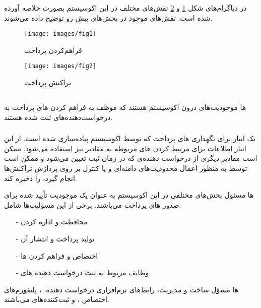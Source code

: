 \documentclass[oneside]{report}
\begin{document}
در دیاگرام‌های شکل 
\ref{fig:fig1}
و 
\ref{fig:fig2}
 نقش‌های مختلف در این اکوسیستم  بصورت خلاصه آورده شده است. نقش‌های موجود در بخش‌های پیش رو توضیح داده می‌شوند.

\begin{figure}
	\centering
	\texttt{[image: images/fig1]}
	\caption{فراهم‌کردن{\footnotesize  {}} پرداخت }
	\label{fig:fig1}
\end{figure}

\begin{figure}
	\centering
	\texttt{[image: images/fig2]}
	\caption{تراکنش {\footnotesize  {}} پرداخت}
	\label{fig:fig2}
\end{figure}
\newpage
\subsection{{\normalsize {}}}
		{\normalsize  {}}ها 
		موجودیت‌های درون اکوسیستم
		{\normalsize  {}}
		هستند که موظف به فراهم کردن 
		{\normalsize  {}}های
		پرداخت به درخواست‌دهنده‌های 
		{\normalsize  {}}
		ثبت شده هستند. 
 
 \subsubsection{{\small {}}}
			یک انبار برای نگهداری 
			{\normalsize {}}های
			پرداخت که توسط اکوسیستم 
			{\normalsize {}}
			پیاده‌سازی شده است. از این انبار اطلاعات برای مرتبط کردن 
			{\normalsize {}}‌های 
			مربوطه به مقادیر 
			{\normalsize {}}
			نیز استفاده می‌شود. 
			{\normalsize {}}
			ممکن است مقادیر دیگری از درخواست دهنده‌ی 
			{\normalsize {}}
			که در زمان ثبت تعیین می‌شود و ممکن است توسط 
			{\normalsize {}}
			به منظور اعمال محدودیت‌های دامنه‌ای و یا کنترل بر روی پردازش تراکنش‌ها انجام گیرد، را ذخیره کند.
					
	{\normalsize {}}ها 
	مسئول بخش‌‌های مختلفی در این اکوسیستم به عنوان  یک موجودیت تأیید شده برای صدور 
	{\normalsize {}}های 
	پرداخت می‌باشند. برخی از این مسؤلیت‌ها شامل‌:
	\begin{itemize}
		\item[-]محافظت و اداره کردن 
				{\normalsize {}}	
		\item[-]تولید 
					{\normalsize {}}
					پرداخت و انتشار آن
		\item[-] اختصاص و فراهم کردن 
					{\normalsize {}}ها
		\item[-]وظایف مربوط به ثبت درخواست دهنده ‌های 
					{\normalsize {}}
	\end{itemize}
								{\normalsize {}}ها 
								مسؤل ساخت و مدیریت، رابط‌های نرم‌افزاری درخواست دهنده، 
											{\normalsize {}}،
								 پلتفورم‌های اختصاص 
														{\normalsize {}}،
														 و ثبت‌کننده‌های 
																	{\normalsize {}}
																	می‌باشند. 
\end{document}
